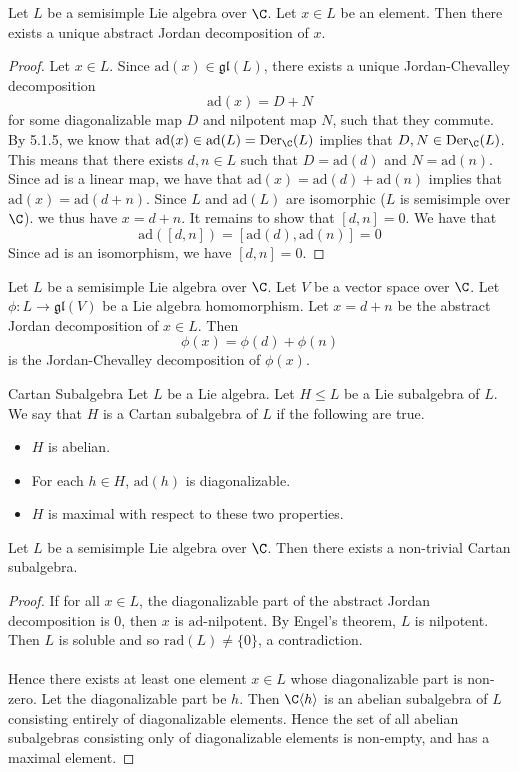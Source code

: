 \documentclass[a4paper]{article}
\begin{document}
\begin{lmm}{}{} Let $L$ be a semisimple Lie algebra over $\C$. Let $x\in L$ be an element. Then there exists a unique abstract Jordan decomposition of $x$. \tcbline
\begin{proof}
Let $x\in L$. Since $\text{ad}(x)\in\mathfrak{gl}(L)$, there exists a unique Jordan-Chevalley decomposition $$\text{ad}(x)=D+N$$ for some diagonalizable map $D$ and nilpotent map $N$, such that they commute. By 5.1.5, we know that $\text{ad}(x)\in\text{ad}(L)=\text{Der}_\C(L)$ implies that $D,N\in\text{Der}_\C(L)$. This means that there exists $d,n\in L$ such that $D=\text{ad}(d)$ and $N=\text{ad}(n)$. Since $\text{ad}$ is a linear map, we have that $\text{ad}(x)=\text{ad}(d)+\text{ad}(n)$ implies that $\text{ad}(x)=\text{ad}(d+n)$. Since $L$ and $\text{ad}(L)$ are isomorphic ($L$ is semisimple over $\C$). we thus have $x=d+n$. It remains to show that $[d,n]=0$. We have that $$\text{ad}([d,n])=[\text{ad}(d),\text{ad}(n)]=0$$ Since $\text{ad}$ is an isomorphism, we have $[d,n]=0$. 
\end{proof}
\end{lmm}

\begin{prp}{}{} Let $L$ be a semisimple Lie algebra over $\C$. Let $V$ be a vector space over $\C$. Let $\phi:L\to\mathfrak{gl}(V)$ be a Lie algebra homomorphism. Let $x=d+n$ be the abstract Jordan decomposition of $x\in L$. Then $$\phi(x)=\phi(d)+\phi(n)$$ is the Jordan-Chevalley decomposition of $\phi(x)$. 
\end{prp}

\begin{defn}{Cartan Subalgebra}{} Let $L$ be a Lie algebra. Let $H\leq L$ be a Lie subalgebra of $L$. We say that $H$ is a Cartan subalgebra of $L$ if the following are true. 
\begin{itemize}
\item $H$ is abelian. 
\item For each $h\in H$, $\text{ad}(h)$ is diagonalizable. 
\item $H$ is maximal with respect to these two properties. 
\end{itemize}
\end{defn}

\begin{lmm}{}{} Let $L$ be a semisimple Lie algebra over $\C$. Then there exists a non-trivial Cartan subalgebra. \tcbline
\begin{proof}
If for all $x\in L$, the diagonalizable part of the abstract Jordan decomposition is $0$, then $x$ is $\text{ad}$-nilpotent. By Engel's theorem, $L$ is nilpotent. Then $L$ is soluble and so $\text{rad}(L)\neq\{0\}$, a contradiction. \\~\\

Hence there exists at least one element $x\in L$ whose diagonalizable part is non-zero. Let the diagonalizable part be $h$. Then $\C\langle h\rangle$ is an abelian subalgebra of $L$ consisting entirely of diagonalizable elements. Hence the set of all abelian subalgebras consisting only of diagonalizable elements is non-empty, and has a maximal element. 
\end{proof}
\end{lmm}
\end{document}

